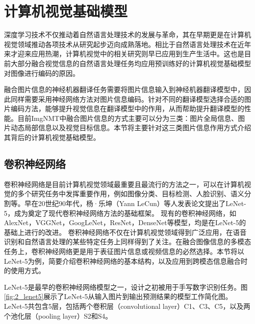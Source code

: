 \section{计算机视觉基础模型}
\label{sec:2_cv}

深度学习技术不仅推动着自然语言处理技术的发展与革命，其在早期更是在计算机视觉领域推动各项技术从研究起步迈向成熟落地。相比于自然语言处理技术在近年来才迎来应用热潮，计算机视觉中的相关研究则早已应用到生产生活中。这也是目前大部分融合视觉信息的自然语言处理任务均应用预训练好的计算机视觉基础模型对图像进行编码的原因。

融合图片信息的神经机器翻译任务需要将图片信息输入到神经机器翻译模型中，因此同样需要采用神经网络方法对图片信息编码。针对不同的翻译模型选择合适的图片编码方法，能够提升视觉信息在翻译模型中的作用，从而帮助提升翻译模型的性能。目前ImgNMT中融合图片信息的方式主要可以分为三类：图片全局信息、图片动态局部信息以及视觉目标信息。本节将主要针对这三类图片信息作用方式介绍其背后的计算机视觉基础模型。


\subsection{卷积神经网络}
\label{sec:2_cnn}

卷积神经网络是目前计算机视觉领域最重要且最流行的方法之一，可以在计算机视觉的多个研究任务中发挥重要作用，例如图像分类、目标检测、人脸识别、语义分割等。早在20世纪90年代，杨·乐坤（Yann LeCun）等人发表论文提出了LeNet-5，成为奠定了现代卷积神经网络方法的基础框架。
现有的卷积神经网络，如AlexNet，VGGNet，GoogLeNet，ResNet，DenseNet等模型，均是在LeNet-5的基础上进行的改进。%
卷积神经网络不仅在计算机视觉领域得到广泛应用，在语音识别和自然语言处理的某些特定任务上同样得到了关注。在融合图像信息的多模态任务上，卷积神经网络更是用于表征图片信息或视频信息的必然选择。本节将以LeNet-5为例，简要介绍卷积神经网络的基本结构，以及应用到跨模态信息融合时的使用方式。


LeNet-5是最早的卷积神经网络模型之一，设计之初被用于手写数字识别任务。图\ref{fig:2_lenet5}展示了LeNet-5从输入图片到输出预测结果的模型工作简化图。LeNet-5共包含5层，包括两个卷积层（convolutional layer）C1、C3、C5，以及两个池化层（pooling layer）S2和S4。

